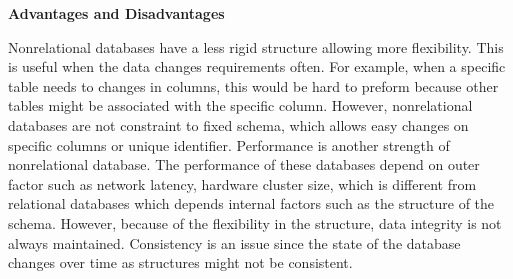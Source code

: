\noindent \textbf{Advantages and Disadvantages}

Nonrelational databases have a less rigid structure allowing more flexibility.
This is useful when the data changes requirements often. For example, when a specific table needs to changes in columns, 
this would be hard to preform because other tables might be associated with the specific column. 
However, nonrelational databases are not constraint to fixed schema, which allows easy changes on specific columns or unique identifier.
Performance is another strength of nonrelational database. 
The performance of these databases depend on outer factor such as network latency, hardware cluster size,
which is different from relational databases which depends internal factors such as the structure of the schema. 
However, because of the flexibility in the structure, data integrity is not always maintained. 
Consistency is an issue since the state of the database changes over time as structures might not be consistent.



